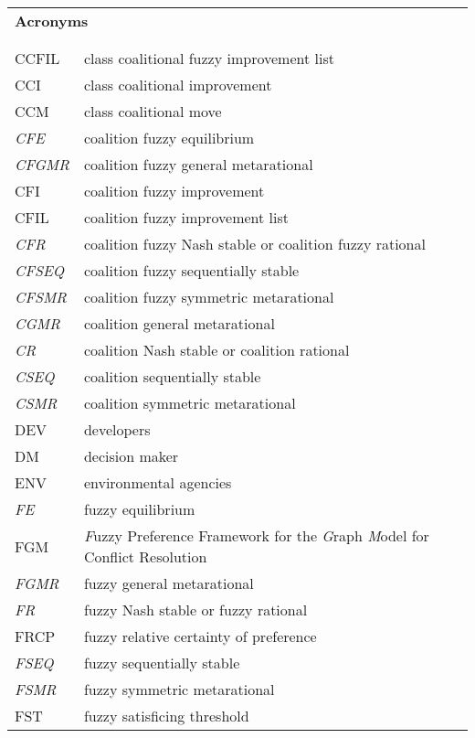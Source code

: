 \begin{longtable}[t]{p{18mm}p{132mm}}
\multicolumn{2}{x{15cm}}{\textbf{\LARGE{Acronyms}}} \\
              &  \\
              &  \\
CCFIL         & class coalitional fuzzy improvement list \\
CCI           & class coalitional improvement \\
CCM           & class coalitional move \\
\emph{CFE}    & coalition fuzzy equilibrium \\
\emph{CFGMR}  & coalition fuzzy general metarational \\
CFI           & coalition fuzzy improvement \\
CFIL          & coalition fuzzy improvement list \\
\emph{CFR}    & coalition fuzzy Nash stable or coalition fuzzy rational \\
\emph{CFSEQ}  & coalition fuzzy sequentially stable \\
\emph{CFSMR}  & coalition fuzzy symmetric metarational \\
\emph{CGMR}   & coalition general metarational \\
\emph{CR}     & coalition Nash stable or coalition rational \\
\emph{CSEQ}   & coalition sequentially stable \\
\emph{CSMR}   & coalition symmetric metarational \\
DEV           & developers \\
DM            & decision maker \\
ENV           & environmental agencies \\
\emph{FE}     & fuzzy equilibrium \\
FGM           & \emph{F}uzzy Preference Framework for the \emph{G}raph \emph{M}odel for Conflict Resolution\\
\emph{FGMR}   & fuzzy general metarational \\
\emph{FR}     & fuzzy Nash stable or fuzzy rational \\
FRCP          & fuzzy relative certainty of preference \\
\emph{FSEQ}   & fuzzy sequentially stable \\
\emph{FSMR}   & fuzzy symmetric metarational \\
FST           & fuzzy satisficing threshold \\

\end{longtable}
